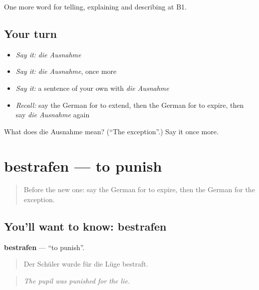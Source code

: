 \begin{grammarlens}[title={What you've built}]
One more word for telling, explaining and describing at B1.
\end{grammarlens}

\subsection*{Your turn}
\begin{itemize}
\raggedright
  \item \emph{Say it:} \emph{die Ausnahme}
  \item \emph{Say it:} \emph{die Ausnahme}, once more
  \item \emph{Say it:} a sentence of your own with \emph{die Ausnahme}
  \item \emph{Recall:} say the German for to extend, then the German for to expire, then say \emph{die Ausnahme} again
\end{itemize}

\begin{tcolorbox}[breakable,colback=teal!4,colframe=teal!35!black,title={Before you move on}]
What does die Ausnahme mean? (\textquotedblleft{}The exception\textquotedblright{}.) Say it once more.
\end{tcolorbox}
\section[bestrafen]{bestrafen — to punish}

\label{lesson:GE-C385-bestrafen}



\begin{quote}
Before the new one: say the German for to expire, then the German for the exception.
\end{quote}

\subsection*{You'll want to know: bestrafen}
\textbf{bestrafen} — \textquotedblleft{}to punish\textquotedblright{}.

\begin{quote}
Der Schüler wurde für die Lüge bestraft.
\end{quote}

\begin{quote}
\emph{The pupil was punished for the lie.}
\end{quote}

